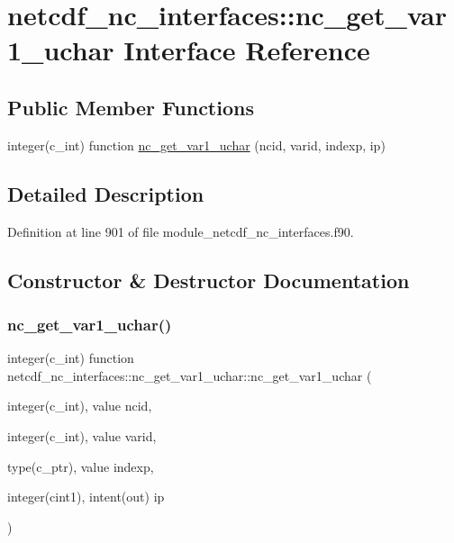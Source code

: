 \hypertarget{interfacenetcdf__nc__interfaces_1_1nc__get__var1__uchar}{}\section{netcdf\+\_\+nc\+\_\+interfaces\+:\+:nc\+\_\+get\+\_\+var1\+\_\+uchar Interface Reference}
\label{interfacenetcdf__nc__interfaces_1_1nc__get__var1__uchar}
\subsection*{Public Member Functions}
\begin{DoxyCompactItemize}
\item 
integer(c\+\_\+int) function \hyperlink{interfacenetcdf__nc__interfaces_1_1nc__get__var1__uchar_a4454da4195479120ad933de085eda991}{nc\+\_\+get\+\_\+var1\+\_\+uchar} (ncid, varid, indexp, ip)
\end{DoxyCompactItemize}


\subsection{Detailed Description}


Definition at line 901 of file module\+\_\+netcdf\+\_\+nc\+\_\+interfaces.\+f90.



\subsection{Constructor \& Destructor Documentation}
\mbox{\label{interfacenetcdf__nc__interfaces_1_1nc__get__var1__uchar_a4454da4195479120ad933de085eda991}} 
\subsubsection{\texorpdfstring{nc\+\_\+get\+\_\+var1\+\_\+uchar()}{nc\_get\_var1\_uchar()}}
{\footnotesize\ttfamily integer(c\+\_\+int) function netcdf\+\_\+nc\+\_\+interfaces\+::nc\+\_\+get\+\_\+var1\+\_\+uchar\+::nc\+\_\+get\+\_\+var1\+\_\+uchar (\begin{DoxyParamCaption}\item[{integer(c\+\_\+int), value}]{ncid,  }\item[{integer(c\+\_\+int), value}]{varid,  }\item[{type(c\+\_\+ptr), value}]{indexp,  }\item[{integer(cint1), intent(out)}]{ip }\end{DoxyParamCaption})}



